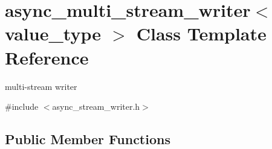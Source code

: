 \hypertarget{classasync__multi__stream__writer}{}\section{async\+\_\+multi\+\_\+stream\+\_\+writer$<$ value\+\_\+type $>$ Class Template Reference}
\label{classasync__multi__stream__writer}


multi-\/stream writer  




{\ttfamily \#include $<$async\+\_\+stream\+\_\+writer.\+h$>$}

\subsection*{Public Member Functions}
